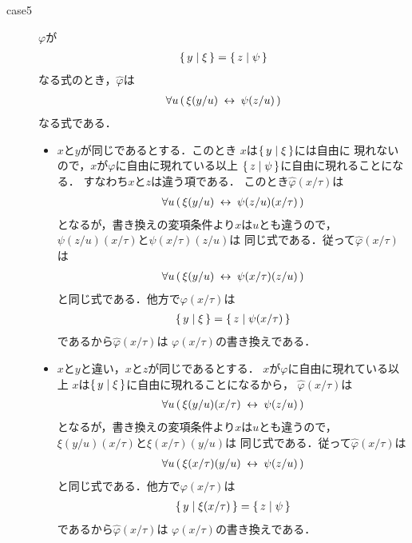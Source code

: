 \begin{metaprf}[第一]
\begin{description}
\begin{description}
					\item[case5] $\varphi$が
						\begin{align}
							\{\, y \mid \xi\, \} = \{\, z \mid \psi\, \}
						\end{align}
						なる式のとき，$\widehat{\varphi}$は
						\begin{align}
							\forall u\, (\, \xi(y/u) \hspace{0.25em}\leftrightarrow\hspace{0.25em} \psi(z/u)\, )
						\end{align}
						なる式である．
						\begin{itemize}
							\item $x$と$y$が同じであるとする．このとき
								$x$は$\{\, y \mid \xi\, \}$には自由に
								現れないので，$x$が$\varphi$に自由に現れている以上
								$\{\, z \mid \psi\, \}$に自由に現れることになる．
								すなわち$x$と$z$は違う項である．
								このとき$\widehat{\varphi}(x/\tau)$は
								\begin{align}
									\forall u\, (\, \xi(y/u) \hspace{0.25em}\leftrightarrow\hspace{0.25em} \psi(z/u)(x/\tau)\, )
								\end{align}
								となるが，書き換えの変項条件より$x$は$u$とも違うので，
								$\psi(z/u)(x/\tau)$と$\psi(x/\tau)(z/u)$は
								同じ式である．従って$\widehat{\varphi}(x/\tau)$は
								\begin{align}
									\forall u\, (\, \xi(y/u) \hspace{0.25em}\leftrightarrow\hspace{0.25em} \psi(x/\tau)(z/u)\, )
								\end{align}
								と同じ式である．他方で$\varphi(x/\tau)$は
								\begin{align}
									\{\, y \mid \xi\, \} = \{\, z \mid \psi(x/\tau)\, \}
								\end{align}
								であるから$\widehat{\varphi}(x/\tau)$は
								$\varphi(x/\tau)$の書き換えである．
								
							\item $x$と$y$と違い，$x$と$z$が同じであるとする．
								$x$が$\varphi$に自由に現れている以上
								$x$は$\{\, y \mid \xi\, \}$に自由に現れることになるから，
								$\widehat{\varphi}(x/\tau)$は
								\begin{align}
									\forall u\, (\, \xi(y/u)(x/\tau) \hspace{0.25em}\leftrightarrow\hspace{0.25em} \psi(z/u)\, )
								\end{align}
								となるが，書き換えの変項条件より$x$は$u$とも違うので，
								$\xi(y/u)(x/\tau)$と$\xi(x/\tau)(y/u)$は
								同じ式である．従って$\widehat{\varphi}(x/\tau)$は
								\begin{align}
									\forall u\, (\, \xi(x/\tau)(y/u) \hspace{0.25em}\leftrightarrow\hspace{0.25em} \psi(z/u)\, )
								\end{align}
								と同じ式である．他方で$\varphi(x/\tau)$は
								\begin{align}
									\{\, y \mid \xi(x/\tau)\, \} = \{\, z \mid \psi\, \}
								\end{align}
								であるから$\widehat{\varphi}(x/\tau)$は
								$\varphi(x/\tau)$の書き換えである．
							

\end{itemize}
\end{description}
\end{description}
\end{metaprf}
